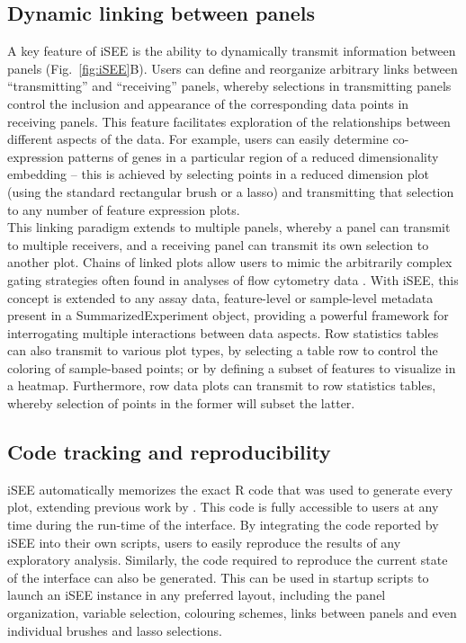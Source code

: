 \documentclass[10pt,a4paper,twocolumn]{article}
\let\cite\citep
\begin{document}
\subsection*{Dynamic linking between panels}
A key feature of iSEE is the ability to dynamically transmit information between panels (Fig.~\ref{fig:iSEE}B).
Users can define and reorganize arbitrary links between ``transmitting'' and ``receiving'' panels, whereby selections in transmitting panels control the inclusion and appearance of the corresponding data points in receiving panels.
This feature facilitates exploration of the relationships between different aspects of the data.
For example, users can easily determine co-expression patterns of genes in a particular region of a reduced dimensionality embedding -- this is achieved by selecting points in a reduced dimension plot (using the standard rectangular brush or a lasso) and transmitting that selection to any number of feature expression plots.\\

This linking paradigm extends to multiple panels, whereby a panel can transmit to multiple receivers, and a receiving panel can transmit its own selection to another plot.
Chains of linked plots allow users to mimic the arbitrarily complex gating strategies often found in analyses of flow cytometry data \citep{finak2014opencyto}.
With iSEE, this concept is extended to any assay data, feature-level or sample-level metadata present in a SummarizedExperiment object, providing a powerful framework for interrogating multiple interactions between data aspects.
Row statistics tables can also transmit to various plot types, by selecting a table row to control the coloring of sample-based points;
or by defining a subset of features to visualize in a heatmap.
Furthermore, row data plots can transmit to row statistics tables, whereby selection of points in the former will subset the latter.

\subsection*{Code tracking and reproducibility}

iSEE automatically memorizes the exact R code that was used to generate every plot, extending previous work by \cite{marini2016interrepro}.
This code is fully accessible to users at any time during the run-time of the interface.
By integrating the code reported by iSEE into their own scripts, users to easily reproduce the results of any exploratory analysis.
Similarly, the code required to reproduce the current state of the interface can also be generated.
This can be used in startup scripts to launch an iSEE instance in any preferred layout, including the panel organization, variable selection, colouring schemes, links between panels and even individual brushes and lasso selections.
\end{document}
